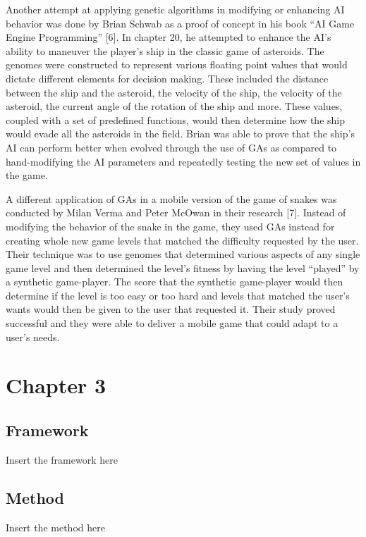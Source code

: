 \documentclass[letterpaper,10pt,titlepage]{article}
\begin{document}
	Another attempt at applying genetic algorithms in modifying or 
	enhancing AI behavior was done by Brian Schwab as a proof of concept in his book “AI Game Engine Programming” [6]. In chapter 20, he attempted to enhance the AI's ability to maneuver 
	the player's ship in the classic game of asteroids. The genomes were constructed to represent various floating point values that would dictate different elements for decision making. 
	These included the distance between the ship and the asteroid, the velocity of the ship, the velocity of the asteroid, the current angle of the rotation of the ship and more. 
	These values, coupled with a set of predefined functions, would then determine how the ship would evade all the asteroids in the field. Brian was able to prove that the ship's AI can 
	perform better when evolved through the use of GAs as compared to hand-modifying the AI parameters and repeatedly testing the new set of values in the game.
	
	A different application of GAs in a mobile version of the game of snakes was conducted by Milan Verma and Peter McOwan in their research [7]. Instead of modifying the behavior of the 
	snake in the game, they used GAs instead for creating whole new game levels that matched the difficulty requested by the user. Their technique was to use genomes that determined various 
	aspects of any single game level and then determined the level's fitness by having the level “played” by a synthetic game-player. The score that the synthetic game-player would then determine 
	if the level is too easy or too hard and levels that matched the user's wants would then be given to the user that requested it. Their study proved successful and they were able to deliver a 
	mobile game that could adapt to a user's needs.


\section*{Chapter 3}


\subsection*{Framework}
Insert the framework here


\subsection*{Method}
Insert the method here
\end{document}
